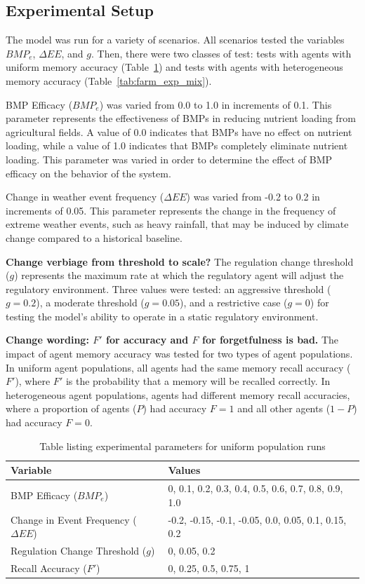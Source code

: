 \subsection{Experimental Setup}
\label{subsec:farm_exp_setup}

The model was run for a variety of scenarios.
All scenarios tested the variables $BMP_e$, $\Delta EE$,
and $g$.
Then, there were two classes of test:
tests with agents with uniform memory accuracy (Table~\ref{tab:farm_exp_par})
and tests with agents with heterogeneous memory accuracy
(Table~\ref{tab:farm_exp_mix}).

BMP Efficacy ($BMP_e$) was varied from 0.0 to 1.0 in increments of 0.1.
This parameter represents the effectiveness of BMPs in reducing nutrient
loading from agricultural fields.
A value of 0.0 indicates that BMPs have no effect on nutrient loading,
while a value of 1.0 indicates that BMPs completely eliminate nutrient loading.
This parameter was varied in order to determine the effect of BMP efficacy
on the behavior of the system.

Change in weather event frequency ($\Delta EE$) was varied from -0.2
to 0.2 in increments of 0.05.
This parameter represents the change in the frequency of extreme weather
events, such as heavy rainfall, that may be induced by climate change
compared to a historical baseline.

\textbf{Change verbiage from threshold to scale?}
The regulation change threshold ($g$) represents the maximum rate at which
the regulatory agent will adjust the regulatory environment.
Three values were tested: an aggressive threshold ($g=0.2$),
a moderate threshold ($g=0.05$), and
a restrictive case ($g=0$) for testing the model's ability to
operate in a static regulatory environment.

\textbf{Change wording: $F'$ for accuracy and $F$ for forgetfulness is bad.}
The impact of agent memory accuracy was tested for two types of agent
populations.
In uniform agent populations, all agents had the same memory recall
accuracy ($F'$), where $F'$ is the probability that a memory will be
recalled correctly.
In heterogeneous agent populations, agents had different memory recall
accuracies, 
where a proportion of agents ($P$) had accuracy $F=1$
and all other agents ($1-P$) had accuracy $F=0$.

\begin{table}
\centering
\caption{Table listing experimental parameters for uniform population runs}
\label{tab:farm_exp_par}
\begin{tabular}{ll}
\hline
Variable & Values \\
\hline
BMP Efficacy ($BMP_e$) & 0, 0.1, 0.2, 0.3, 0.4, 0.5, 0.6, 0.7, 0.8, 0.9, 1.0 \\
Change in Event Frequency ($\Delta EE$)
    & -0.2, -0.15, -0.1, -0.05, 0.0, 0.05, 0.1, 0.15, 0.2 \\
Regulation Change Threshold ($g$)
    & 0, 0.05, 0.2 \\
Recall Accuracy ($F'$) & 0, 0.25, 0.5, 0.75, 1 \\
\hline
\end{tabular}
\end{table}

